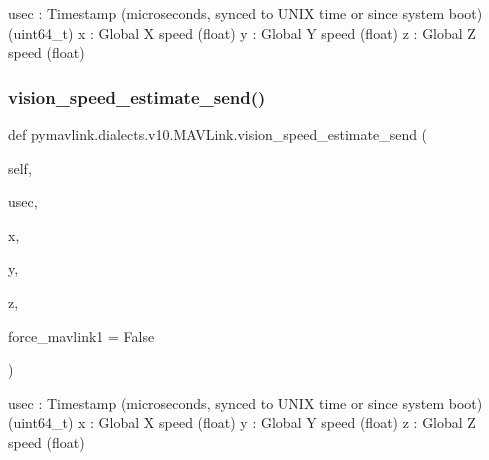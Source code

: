 \begin{DoxyVerb}
\begin{DoxyVerb}
\begin{DoxyVerb}
\begin{DoxyVerb}
\begin{DoxyVerb}
\begin{DoxyVerb}
\begin{DoxyVerb}
\begin{DoxyVerb}
\begin{DoxyVerb}
\begin{DoxyVerb}
\begin{DoxyVerb}usec                      : Timestamp (microseconds, synced to UNIX time or since system boot) (uint64_t)
x                         : Global X speed (float)
y                         : Global Y speed (float)
z                         : Global Z speed (float)\end{DoxyVerb}
 \mbox{\label{classpymavlink_1_1dialects_1_1v10_1_1MAVLink_ae7c137f7207fcb390166f8a28024926c}} 
\subsubsection{\texorpdfstring{vision\+\_\+speed\+\_\+estimate\+\_\+send()}{vision\_speed\_estimate\_send()}}
{\footnotesize\ttfamily def pymavlink.\+dialects.\+v10.\+M\+A\+V\+Link.\+vision\+\_\+speed\+\_\+estimate\+\_\+send (\begin{DoxyParamCaption}\item[{}]{self,  }\item[{}]{usec,  }\item[{}]{x,  }\item[{}]{y,  }\item[{}]{z,  }\item[{}]{force\+\_\+mavlink1 = {\ttfamily False} }\end{DoxyParamCaption})}

\begin{DoxyVerb}usec                      : Timestamp (microseconds, synced to UNIX time or since system boot) (uint64_t)
x                         : Global X speed (float)
y                         : Global Y speed (float)
z                         : Global Z speed (float)\end{DoxyVerb}
 \mbox{\label{classpymavlink_1_1dialects_1_1v10_1_1MAVLink_a6c527e8921d0106f1df4e50e2fe2c3a0}} 

\end{DoxyVerb}
\end{DoxyVerb}
\end{DoxyVerb}
\end{DoxyVerb}
\end{DoxyVerb}
\end{DoxyVerb}
\end{DoxyVerb}
\end{DoxyVerb}
\end{DoxyVerb}
\end{DoxyVerb}
